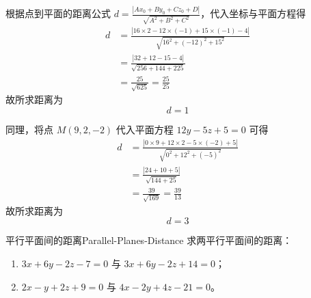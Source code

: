 \begin{solution}

    根据点到平面的距离公式 $d = \frac{|Ax_0 + By_0 + Cz_0 + D|}{\sqrt{A^2 + B^2 + C^2}}$，代入坐标与平面方程得
    \begin{equation*}
        \begin{aligned}
            d & = \frac{|16 \times 2 - 12 \times (-1) + 15 \times (-1) - 4|}{\sqrt{16^2 + (-12)^2 + 15^2}} \\
              & = \frac{|32 + 12 - 15 - 4|}{\sqrt{256 + 144 + 225}}                                        \\
              & = \frac{25}{\sqrt{625}} = \frac{25}{25}
        \end{aligned}
    \end{equation*}
    故所求距离为
    \begin{equation*}
        \boxed{d = 1}
    \end{equation*}


    同理，将点 $M(9, 2, -2)$ 代入平面方程 $12y - 5z + 5 = 0$ 可得
    \begin{equation*}
        \begin{aligned}
            d & = \frac{|0 \times 9 + 12 \times 2 - 5 \times (-2) + 5|}{\sqrt{0^2 + 12^2 + (-5)^2}} \\
              & = \frac{|24 + 10 + 5|}{\sqrt{144 + 25}}                                             \\
              & = \frac{39}{\sqrt{169}} = \frac{39}{13}
        \end{aligned}
    \end{equation*}
    故所求距离为
    \begin{equation*}
        \boxed{d = 3}
    \end{equation*}
\end{solution}


\begin{problem}{平行平面间的距离}{Parallel-Planes-Distance}
    求两平行平面间的距离：
    \begin{enumerate}
        \item $3x + 6y - 2z - 7 = 0$ 与 $3x + 6y - 2z + 14 = 0$；
        \item $2x - y + 2z + 9 = 0$ 与 $4x - 2y + 4z - 21 = 0$。
    \end{enumerate}
\end{problem}


